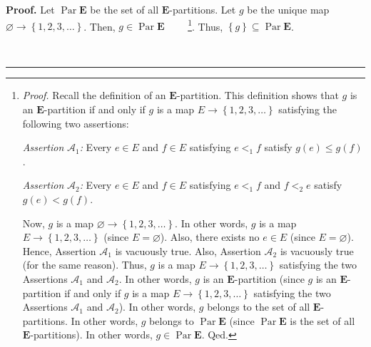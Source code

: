\documentclass[numbers=enddot,12pt,final,onecolumn,notitlepage,abstracton]{scrartcl}
\theoremstyle{definition}
\newenvironment{proof}[1][Proof]{\noindent\textbf{#1.} }{\ \rule{0.5em}{0.5em}}
\newenvironment{verlong}{}{}
\begin{document}
\begin{verlong}
\begin{footnotesize}
\begin{proof}
Let $\operatorname*{Par}\mathbf{E}$ be the set of all $\mathbf{E}$-partitions.
Let $g$ be the unique map $\varnothing\rightarrow\left\{  1,2,3,\ldots
\right\}  $. Then, $g\in\operatorname*{Par}\mathbf{E}$%
\ \ \ \ \footnote{\textit{Proof.} Recall the definition of an $\mathbf{E}%
$-partition. This definition shows that $g$ is an $\mathbf{E}$-partition if
and only if $g$ is a map $E\rightarrow\left\{  1,2,3,\ldots\right\}  $
satisfying the following two assertions:
\par
\textit{Assertion }$\mathcal{A}_{1}$\textit{:} Every $e\in E$ and $f\in E$
satisfying $e<_{1}f$ satisfy $g\left(  e\right)  \leq g\left(  f\right)  $.
\par
\textit{Assertion }$\mathcal{A}_{2}$\textit{:} Every $e\in E$ and $f\in E$
satisfying $e<_{1}f$ and $f<_{2}e$ satisfy $g\left(  e\right)  <g\left(
f\right)  $.
\par
Now, $g$ is a map $\varnothing\rightarrow\left\{  1,2,3,\ldots\right\}  $. In
other words, $g$ is a map $E\rightarrow\left\{  1,2,3,\ldots\right\}  $ (since
$E=\varnothing$). Also, there exists no $e\in E$ (since $E=\varnothing$).
Hence, Assertion $\mathcal{A}_{1}$ is vacuously true. Also, Assertion
$\mathcal{A}_{2}$ is vacuously true (for the same reason). Thus, $g$ is a map
$E\rightarrow\left\{  1,2,3,\ldots\right\}  $ satisfying the two Assertions
$\mathcal{A}_{1}$ and $\mathcal{A}_{2}$. In other words, $g$ is an
$\mathbf{E}$-partition (since $g$ is an $\mathbf{E}$-partition if and only if
$g$ is a map $E\rightarrow\left\{  1,2,3,\ldots\right\}  $ satisfying the two
Assertions $\mathcal{A}_{1}$ and $\mathcal{A}_{2}$). In other words, $g$
belongs to the set of all $\mathbf{E}$-partitions. In other words, $g$ belongs
to $\operatorname*{Par}\mathbf{E}$ (since $\operatorname*{Par}\mathbf{E}$ is
the set of all $\mathbf{E}$-partitions). In other words, $g\in
\operatorname*{Par}\mathbf{E}$. Qed.}. Thus, $\left\{  g\right\}
\subseteq\operatorname*{Par}\mathbf{E}$.


\end{proof}
\end{footnotesize}
\end{verlong}
\end{document}
